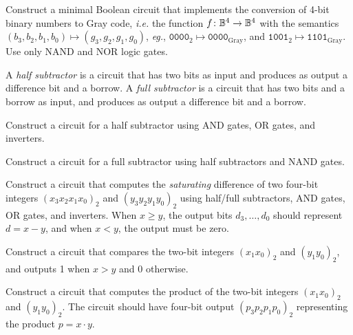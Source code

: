 \documentclass[a4paper,12pt]{article}
\begin{document}
\begin{tasks}
    \item Construct a minimal Boolean circuit that implements the conversion of 4-bit binary numbers to Gray code, \textit{i.e.} the function $f \colon \mathbb{B}^4 \to \mathbb{B}^4$ with the semantics $(b_3,b_2,b_1,b_0) \mapsto (g_3,g_2,g_1,g_0)$, \textit{e\Cat[1.5pt]g.}, $\mathtt{0000}_{2} \mapsto \mathtt{0000}_{\mathrm{Gray}}$, and $\mathtt{1001}_{2} \mapsto \mathtt{1101}_{\mathrm{Gray}}$.
    Use only NAND and NOR logic gates.


    \item A \textit{half subtractor} is a circuit that has two bits as input and produces as output a difference bit and a borrow. A \textit{full subtractor} is a circuit that has two bits and a borrow as input, and produces as output a difference bit and a borrow.

    \begin{subtasks}
        \item Construct a circuit for a half subtractor using AND gates, OR gates, and inverters.

        \item Construct a circuit for a full subtractor using half subtractors and NAND gates.

        \item Construct a circuit that computes the \textit{saturating} difference of two four-bit integers $(x_3 x_2 x_1 x_0)_2$ and $(y_3 y_2 y_1 y_0)_2$ using half/full subtractors, AND gates, OR gates, and inverters.
        When $x \geq y$, the output bits $d_3, \dots, d_0$ should represent $d = x - y$, and when $x < y$, the output must be zero.
    \end{subtasks}


    \item Construct a circuit that compares the two-bit integers $(x_1 x_0)_2$ and $(y_1 y_0)_2$, and outputs 1 when $x > y$ and 0 otherwise.


    \item Construct a circuit that computes the product of the two-bit integers $(x_1 x_0)_2$ and $(y_1 y_0)_2$.
    The circuit should have four-bit output $(p_3 p_2 p_1 p_0)_2$ representing the product $ p = x \cdot y$.





\end{tasks}
\end{document}
